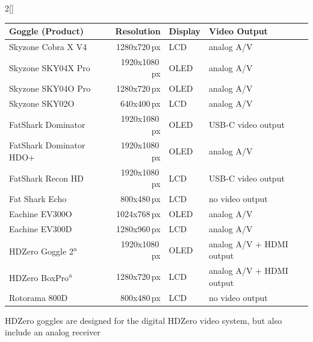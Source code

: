 \begin{paracol}{2}[]
\begin{table}[htb!]
\centering
\setlength{\tabcolsep}{4pt}       %
\renewcommand{\arraystretch}{1} %
\begin{threeparttable}
\label{TabelleVideobrillen}
\begin{tabular}{l@{\hskip 8mm}r@{\hskip 8mm}l@{\hskip 8mm}l}
\toprule
Goggle (Product)                      & Resolution    & Display & Video Output             \\
\midrule
Skyzone Cobra X V4                    & 1280x720\,px  & LCD     & analog A/V               \\
Skyzone SKY04X Pro                    & 1920x1080\,px & OLED    & analog A/V               \\
Skyzone SKY04O Pro                    & 1280x720\,px  & OLED    & analog A/V               \\
Skyzone SKY02O                        & 640x400\,px   & LCD     & analog A/V               \\
FatShark Dominator                    & 1920x1080\,px & OLED    & USB-C video output       \\
FatShark Dominator HDO+               & 1920x1080\,px & OLED    & analog A/V               \\
FatShark Recon HD                     & 1920x1080\,px & LCD     & USB-C video output       \\
Fat Shark Echo                        & 800x480\,px   & LCD     & no video output          \\
Eachine EV300O                        & 1024x768\,px  & OLED    & analog A/V               \\ 
Eachine EV300D                        & 1280x960\,px  & LCD     & analog A/V               \\
HDZero Goggle 2\textsuperscript{a}    & 1920x1080\,px & OLED    & analog A/V + HDMI output \\
HDZero BoxPro\textsuperscript{a}      & 1280x720\,px  & LCD     & analog A/V + HDMI output \\
Rotorama 800D                         & 800x480\,px   & LCD     & no video output          \\
\bottomrule
\end{tabular}
\begin{tablenotes}
\footnotesize
\item[a] HDZero goggles are designed for the digital HDZero video system, but also include an analog receiver
\end{tablenotes}
\end{threeparttable}
\end{table}
\FloatBarrier


\end{paracol}
